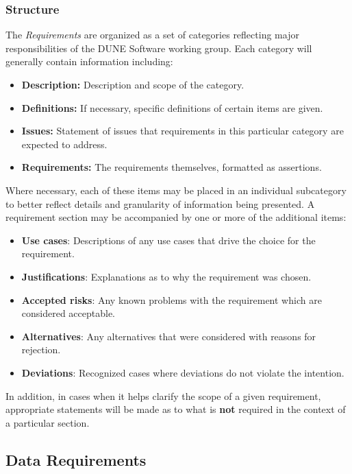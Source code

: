 \subsubsection{Structure}

The \textit{Requirements} are organized as a set of categories reflecting major responsibilities of the DUNE Software working group.  Each category will generally
contain information including:

\begin{itemize}
\item \textbf{Description:} Description and scope of the category.
\item \textbf{Definitions:} If necessary, specific definitions of certain items are given.
\item \textbf{Issues:} Statement of issues that requirements in this particular category are expected to address.
\item \textbf{Requirements:} The requirements themselves, formatted as assertions.
\end{itemize}

Where necessary, each of these items may be placed in an individual subcategory to better reflect details and granularity of information being presented. A requirement section may be accompanied by one or more of the additional items:

\begin{itemize}
\item \textbf{Use cases}: Descriptions of any use cases that drive the choice for the requirement.
\item \textbf{Justifications}: Explanations as to why the requirement was chosen.
\item \textbf{Accepted risks}: Any known problems with the requirement which are considered acceptable.
\item \textbf{Alternatives}: Any alternatives that were considered with reasons for rejection.
\item \textbf{Deviations}: Recognized cases where deviations do not violate the intention.
\end{itemize}

In addition, in cases when it helps clarify the scope of a given  requirement, appropriate statements will be made as to what is \textbf{not} required in the context of a particular section.


\subsection{Data Requirements}
\label{sec:dunedata}


